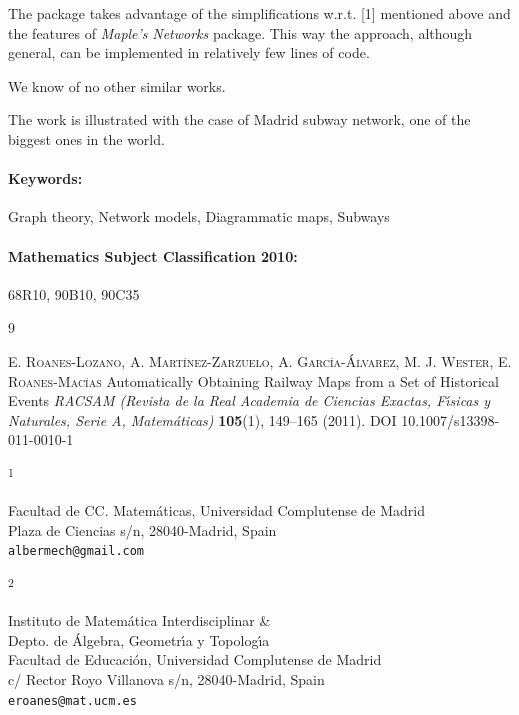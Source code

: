 \documentclass{article}
\newcommand{\ADDRESS}[2]{\noindent
  \textsuperscript{#1}\parbox[t]{0.9\textwidth}{#2} \vspace{6pt}}
\newcommand{\KEYWORDS}[1]{\paragraph{Keywords:} #1}
\newcommand{\MSCLASSIFICATION}[1]{\paragraph{Mathematics Subject Classification 2010:} #1}
\begin{document}
The package takes advantage of the simplifications w.r.t. [1]
mentioned above
and the features of \textit{Maple's} \textit{Networks} package.
This way the approach, although general, can be implemented in 
relatively few lines of code. 

We know of no other similar works.

The work is illustrated with the case of Madrid subway network,
one of the biggest ones in the world.


\KEYWORDS {Graph theory, Network models, Diagrammatic maps, Subways}


\MSCLASSIFICATION{68R10, 90B10, 90C35}
%


\begin{thebibliography}{9}

   \textsc{E. Roanes-Lozano, A. Mart\'{\i}nez-Zarzuelo, 
                           A. Garc\'{\i}a-\'Alvarez, 
                           M. J. Wester, E. Roanes-Mac\'{\i}as}
                    Automatically Obtaining Railway Maps from a Set of Historical 
                    Events
                    \emph{ RACSAM (Revista de la Real Academia de Ciencias Exactas,      
                     F\'{\i}sicas y Naturales, Serie A, Matem\'aticas)}
                    \textbf{105}(1), 149--165 (2011).
                    DOI 10.1007/s13398-011-0010-1
\end{thebibliography}

\vspace{1cm}

\ADDRESS{1}{
            Facultad de CC. Matem\'aticas, Universidad Complutense de Madrid\\ 
            Plaza de Ciencias s/n, 28040-Madrid, Spain \\
\texttt{albermech@gmail.com}


\vspace{.5cm}

\ADDRESS{2}{
            Instituto de Matem\'atica Interdisciplinar \& \\
            Depto. de \'Algebra, Geometr\'{\i}a y Topolog\'{\i}a\\
            Facultad de Educaci\'on, Universidad Complutense de Madrid\\ 
            c/ Rector Royo Villanova s/n, 28040-Madrid, Spain \\
\texttt{eroanes@mat.ucm.es}
}
}
\end{document}
